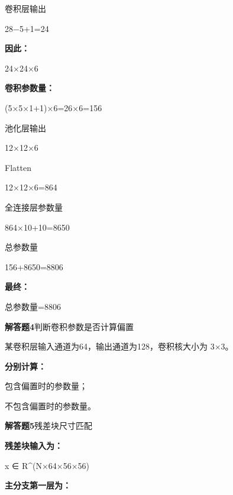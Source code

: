 \documentclass[UTF8,openany,oneside,zihao=-4,fontset=windows]{ctexbook}
\newif\ifshowsolutions
\newcommand{\Question}[2]{%
  \par\Needspace{4\baselineskip}\medskip
  \noindent\textbf{\color{MVBlue}#1}\quad #2\par
}
\newenvironment{AnswerBox}{\begin{tcolorbox}[breakable,colback=MVLight,colframe=MVBlue!45,title={参考答案},fonttitle=\bfseries,boxrule=0.55pt,arc=1.5mm,left=2mm,right=2mm,top=1.5mm,bottom=1.5mm]}{\end{tcolorbox}}
\newcommand{\PracticeSpace}[1]{\ifshowsolutions\else\par\vspace{#1}\par\fi}
\begin{document}
\begin{AnswerBox}
\par 卷积层输出
\par 28−5+1=24
\par\noindent\textbf{因此：}
\par 24×24×6
\par\noindent\textbf{卷积参数量：}
\par (5×5×1+1)×6=26×6=156
\par 池化层输出
\par 12×12×6
\par Flatten
\par 12×12×6=864
\par 全连接层参数量
\par 864×10+10=8650
\par 总参数量
\par 156+8650=8806
\par\noindent\textbf{最终：}
\par 总参数量=8806
\end{AnswerBox}
\else
\PracticeSpace{4.2cm}
\fi
\Question{解答题4}{判断卷积参数是否计算偏置}
\par 某卷积层输入通道为64，输出通道为128，卷积核大小为 3×3。
\par\noindent\textbf{分别计算：}
\par\noindent\textbullet\quad 包含偏置时的参数量；
\par 不包含偏置时的参数量。
\ifshowsolutions
\begin{AnswerBox}
\par\noindent\textbf{卷积权重数量：}
\par 3×3×64×128=73728
\par\noindent\textbf{包含偏置时，每个输出通道有一个偏置：}
\par 73728+128=73856
\par\noindent\textbf{因此：}
\par 无偏置
\par 含偏置
\begin{center}\small\ttfamily 无偏置 = 73728；含偏置 = 73856\end{center}
\end{AnswerBox}
\else
\PracticeSpace{4.2cm}
\fi
\Question{解答题5}{残差块尺寸匹配}
\par\noindent\textbf{残差块输入为：}
\begin{center}\small\ttfamily x ∈ R\textasciicircum{}(N×64×56×56)\end{center}
\par\noindent\textbf{主分支第一层为：}
\end{document}
